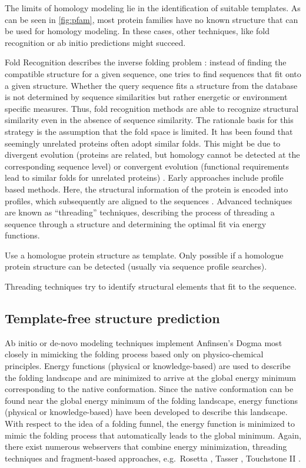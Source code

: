 \documentclass[12pt,a4paper,twoside]{book}
\theoremstyle{definition}
\theoremstyle{definition}
\theoremstyle{remark}
\begin{document}
The limits of homology modeling lie in the identification of suitable
templates. As can be seen in \autoref{fig:pfam}, most protein families
have no known structure that can be used for homology modeling. In these
cases, other techniques, like fold recognition or ab initio predictions
might succeed.

Fold Recognition describes the inverse folding problem
\citep{Bowie1993}: instead of finding the compatible structure for a
given sequence, one tries to find sequences that fit onto a given
structure. Whether the query sequence fits a structure from the database
is not determined by sequence similarities but rather energetic or
environment specific measures. Thus, fold recognition methods are able
to recognize structural similarity even in the absence of sequence
similarity. The rationale basis for this strategy is the assumption that
the fold space is limited. It has been found that seemingly unrelated
proteins often adopt similar folds. This might be due to divergent
evolution (proteins are related, but homology cannot be detected at the
corresponding sequence level) or convergent evolution (functional
requirements lead to similar folds for unrelated proteins)
\citep{Gu2009}. Early approaches include profile based methods. Here,
the structural information of the protein is encoded into profiles,
which subsequently are aligned to the sequences
\citep{Bowie1991,Fischer1996,Ouzounis1993}. Advanced techniques are
known as ``threading'' techniques, describing the process of threading a
sequence through a structure and determining the optimal fit via energy
functions. \citep{Jones1992,Jones1998,Lemer1995}

Use a homologue protein structure as template. Only possible if a
homologue protein structure can be detected (usually via sequence
profile searches).

Threading techniques try to identify structural elements that fit to the
sequence.

\subsection{Template-free structure
prediction}\label{template-free-structure-prediction}

Ab initio or de-novo modeling techniques implement Anfinsen's Dogma most
closely in mimicking the folding process based only on physico-chemical
principles. Energy functions (physical or knowledge-based) are used to
describe the folding landscape and are minimized to arrive at the global
energy minimum corresponding to the native conformation. Since the
native conformation can be found near the global energy minimum of the
folding landscape, energy functions (physical or knowledge-based) have
been developed to describe this landscape. With respect to the idea of a
folding funnel, the energy function is minimized to mimic the folding
process that automatically leads to the global minimum. Again, there
exist numerous webservers that combine energy minimization, threading
techniques and fragment-based approaches, e.g.~Rosetta
\citep{Simons1999}, Tasser \citep{Zhang2004}, Touchstone II
\citep{Zhang2003}.
\end{document}
